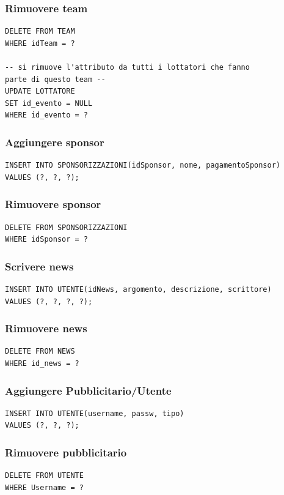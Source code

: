 \documentclass[a4paper,12pt]{report}
\begin{document}
\subsubsection{Rimuovere team}
\begin{verbatim}
DELETE FROM TEAM 
WHERE idTeam = ?

-- si rimuove l'attributo da tutti i lottatori che fanno 
parte di questo team --
UPDATE LOTTATORE
SET id_evento = NULL
WHERE id_evento = ?
\end{verbatim}
\subsubsection{Aggiungere sponsor}
\begin{verbatim}
INSERT INTO SPONSORIZZAZIONI(idSponsor, nome, pagamentoSponsor)
VALUES (?, ?, ?);
\end{verbatim}
\subsubsection{Rimuovere sponsor}
\begin{verbatim}
DELETE FROM SPONSORIZZAZIONI
WHERE idSponsor = ?
\end{verbatim}
\subsubsection{Scrivere news}
\begin{verbatim}
INSERT INTO UTENTE(idNews, argomento, descrizione, scrittore)
VALUES (?, ?, ?, ?);
\end{verbatim}
\subsubsection{Rimuovere news}
\begin{verbatim}
DELETE FROM NEWS
WHERE id_news = ?
\end{verbatim}
\subsubsection{Aggiungere Pubblicitario/Utente}
\begin{verbatim}
INSERT INTO UTENTE(username, passw, tipo)
VALUES (?, ?, ?);
\end{verbatim}
\subsubsection{Rimuovere pubblicitario}
\begin{verbatim}
DELETE FROM UTENTE
WHERE Username = ?
\end{verbatim}
\end{document}
